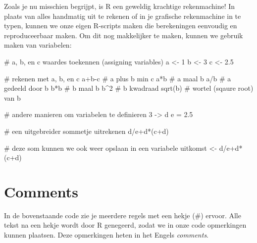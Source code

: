 \documentclass[
  a4paper,
]{scrbook}
\newenvironment{Shaded}{\begin{snugshade}}{\end{snugshade}}
\newcommand{\CommentTok}[1]{\textcolor[rgb]{0.37,0.37,0.37}{#1}}
\newcommand{\DecValTok}[1]{\textcolor[rgb]{0.68,0.00,0.00}{#1}}
\newcommand{\FloatTok}[1]{\textcolor[rgb]{0.68,0.00,0.00}{#1}}
\newcommand{\FunctionTok}[1]{\textcolor[rgb]{0.28,0.35,0.67}{#1}}
\newcommand{\NormalTok}[1]{\textcolor[rgb]{0.00,0.23,0.31}{#1}}
\newcommand{\OtherTok}[1]{\textcolor[rgb]{0.00,0.23,0.31}{#1}}
\newcommand{\SpecialCharTok}[1]{\textcolor[rgb]{0.37,0.37,0.37}{#1}}
\theoremstyle{definition}
\theoremstyle{remark}
\begin{document}
Zoals je nu misschien begrijpt, is R een geweldig krachtige
rekenmachine! In plaats van alles handmatig uit te rekenen of in je
grafische rekenmachine in te typen, kunnen we onze eigen R-scripts maken
die berekeningen eenvoudig en reproduceerbaar maken. Om dit nog
makkelijker te maken, kunnen we gebruik maken van variabelen:

\begin{Shaded}
\begin{Highlighting}[]
\CommentTok{\# a, b, en c waardes toekennen (assigning variables)}
\NormalTok{a }\OtherTok{\textless{}{-}} \DecValTok{1}
\NormalTok{b }\OtherTok{\textless{}{-}} \DecValTok{3}
\NormalTok{c }\OtherTok{\textless{}{-}} \FloatTok{2.5}

\CommentTok{\# rekenen met a, b, en c}
\NormalTok{a}\SpecialCharTok{+}\NormalTok{b}\SpecialCharTok{{-}}\NormalTok{c }\CommentTok{\# a plus b min c}
\NormalTok{a}\SpecialCharTok{*}\NormalTok{b  }\CommentTok{\# a maal b}
\NormalTok{a}\SpecialCharTok{/}\NormalTok{b  }\CommentTok{\# a gedeeld door b}
\NormalTok{b}\SpecialCharTok{*}\NormalTok{b  }\CommentTok{\# b maal b}
\NormalTok{b}\SpecialCharTok{\^{}}\DecValTok{2}  \CommentTok{\# b kwadraad}
\FunctionTok{sqrt}\NormalTok{(b) }\CommentTok{\# wortel (sqaure root) van b}


\CommentTok{\# andere manieren om variabelen te definieren}
\DecValTok{3} \OtherTok{{-}\textgreater{}}\NormalTok{ d}
\NormalTok{e }\OtherTok{=} \FloatTok{2.5}

\CommentTok{\# een uitgebreider sommetje uitrekenen}
\NormalTok{d}\SpecialCharTok{/}\NormalTok{e}\SpecialCharTok{+}\NormalTok{d}\SpecialCharTok{*}\NormalTok{(c}\SpecialCharTok{+}\NormalTok{d)}

\CommentTok{\# deze som kunnen we ook weer opslaan in een variabele}
\NormalTok{uitkomst }\OtherTok{\textless{}{-}}\NormalTok{ d}\SpecialCharTok{/}\NormalTok{e}\SpecialCharTok{+}\NormalTok{d}\SpecialCharTok{*}\NormalTok{(c}\SpecialCharTok{+}\NormalTok{d)}
\end{Highlighting}
\end{Shaded}

\hypertarget{sec-environment}{%
\section{Comments}\label{sec-environment}}

In de bovenstaande code zie je meerdere regels met een hekje (\#)
ervoor. Alle tekst na een hekje wordt door R genegeerd, zodat we in onze
code opmerkingen kunnen plaatsen. Deze opmerkingen heten in het Engels
\emph{comments}.
\end{document}

